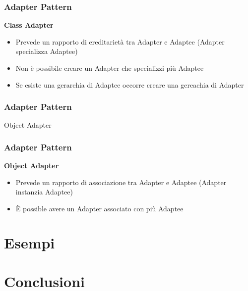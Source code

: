 \documentclass[aspectratio=43]{beamer}
\begin{document}
\begin{frame}
	\frametitle{ Adapter Pattern}
	\textbf{Class Adapter}\pause
	\begin{itemize}
		\item  Prevede un rapporto di ereditarietà tra Adapter e Adaptee (Adapter specializza Adaptee)\pause
		\item Non è possibile creare un Adapter che specializzi più Adaptee\pause
		\item Se esiste una gerarchia di Adaptee occorre creare una gereachia di Adapter
	\end{itemize}
\end{frame}

\begin{frame}
	\frametitle{ Adapter Pattern}
	\centerline{Object Adapter}
	\begin{figure}[h!]
	\end{figure}
\end{frame}

\begin{frame}
	\frametitle{ Adapter Pattern}
	\textbf{Object Adapter}\pause
	\begin{itemize}
		\item  Prevede un rapporto di associazione tra Adapter e Adaptee (Adapter instanzia Adaptee)\pause
		\item È possible avere un Adapter associato con più Adaptee
	\end{itemize}
\end{frame}

\section{Esempi}

\section{Conclusioni}
\end{document}
